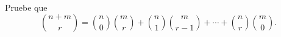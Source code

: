 \begin{statement}{17}
  Pruebe que
  \[
      \binom{n + m}{r} = \binom{n}{0}\binom{m}{r} +
      \binom{n}{1}\binom{m}{r - 1} +
      \cdots +
      \binom{n}{r}\binom{m}{0}.
  \]
\end{statement}